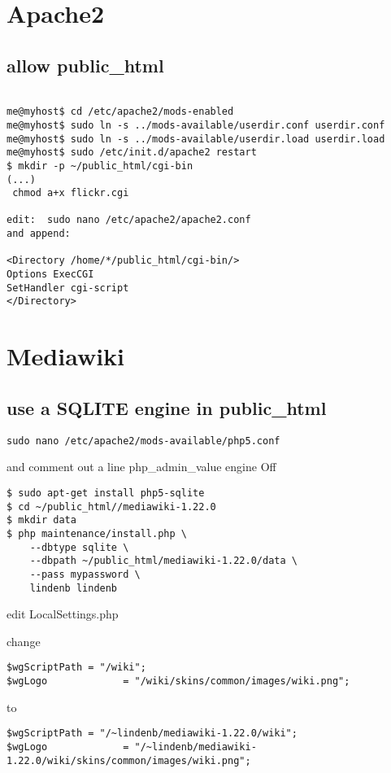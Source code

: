 \documentclass[12pt]{article}
\begin{document}
\section{Apache2}
\subsection{allow public\_html}

\begin{lstlisting}

me@myhost$ cd /etc/apache2/mods-enabled
me@myhost$ sudo ln -s ../mods-available/userdir.conf userdir.conf
me@myhost$ sudo ln -s ../mods-available/userdir.load userdir.load
me@myhost$ sudo /etc/init.d/apache2 restart 
$ mkdir -p ~/public_html/cgi-bin
(...)
 chmod a+x flickr.cgi
 
edit:  sudo nano /etc/apache2/apache2.conf
and append:

<Directory /home/*/public_html/cgi-bin/>
Options ExecCGI
SetHandler cgi-script
</Directory>
\end{lstlisting}

\section{Mediawiki}
\subsection{use a SQLITE engine in public\_html}
\begin{lstlisting}
sudo nano /etc/apache2/mods-available/php5.conf
\end{lstlisting}
and comment out a line php_admin_value engine Off

\begin{lstlisting}
$ sudo apt-get install php5-sqlite
$ cd ~/public_html//mediawiki-1.22.0
$ mkdir data
$ php maintenance/install.php \
	--dbtype sqlite \
	--dbpath ~/public_html/mediawiki-1.22.0/data \
	--pass mypassword \
	lindenb lindenb
\end{lstlisting}

edit LocalSettings.php

change
\begin{lstlisting}
$wgScriptPath = "/wiki";
$wgLogo             = "/wiki/skins/common/images/wiki.png";
\end{lstlisting}
to
\begin{lstlisting}
$wgScriptPath = "/~lindenb/mediawiki-1.22.0/wiki";
$wgLogo             = "/~lindenb/mediawiki-1.22.0/wiki/skins/common/images/wiki.png";
\end{lstlisting}
\end{document}
